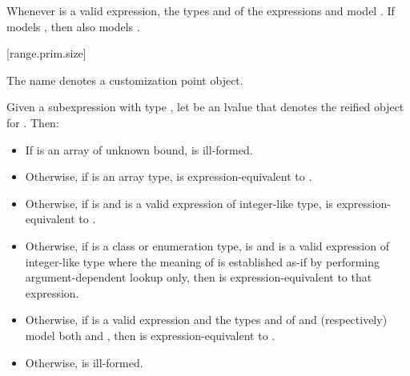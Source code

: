 \pnum
\begin{note}
Whenever  is a valid expression,
the types  and  of the expressions
 and 
model .
If  models ,
then  also models .
\end{note}

[range.prim.size]{}
%

\pnum
The name  denotes a customization point
object.

\pnum
Given a subexpression  with type ,
let  be an lvalue that denotes the reified object for .
Then:

\begin{itemize}
\item
  If  is an array of unknown bound,
   is ill-formed.

\item
  Otherwise, if  is an array type,
   is expression-equivalent to
  .

\item
  Otherwise, if 
  is  and
  is a valid expression of integer-like type,
   is expression-equivalent to
  .

\item
  Otherwise, if  is a class or enumeration type,
   is  and
  is a valid expression of integer-like type
  where the meaning of  is established as-if by performing
  argument-dependent lookup only,
  then  is expression-equivalent to
  that expression.

\item
  Otherwise, if
  is a valid expression and
  the types  and  of  and
   (respectively) model both
   and
  ,
  then  is expres\-sion-equivalent to
  .

\item
  Otherwise,  is ill-formed.
\end{itemize}

